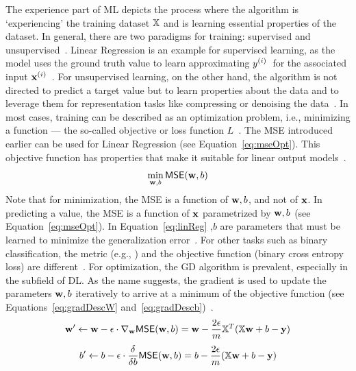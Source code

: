 The experience part of \ac{ML} depicts the process where the algorithm is `experiencing' the training
dataset $\mathbb{X}$ and is learning essential properties of the dataset.
In general, there are two paradigms for training: supervised and
unsupervised~\citep{goodfellow_deep_2016}.
Linear Regression is an example for supervised learning, as the model uses the ground truth value
to learn approximating $y^{(i)}$\ for the associated input
$\textbf{x}^{(i)}$~\citep{alzubi_machine_2018,goodfellow_deep_2016}.
For unsupervised learning, on the other hand, the algorithm is not directed to predict a target
value but to learn properties about the data and to leverage them for representation tasks
like compressing or denoising the data~\citep{goodfellow_deep_2016,geron_hands-machine_2017}.
In most cases, training can be described as an optimization problem, i.e., minimizing a
function --- the so-called objective or loss function $L$~\citep{goodfellow_deep_2016}.
The \ac{MSE} introduced earlier can be used for Linear Regression (see Equation~\ref{eq:mseOpt}).
This objective function has properties that make it suitable for linear output
models~\citep{goodfellow_deep_2016}.
\begin{equation}\label{eq:mseOpt}
    \min_{\textbf{w},b} \textsf{MSE}(\textbf{w},b)
\end{equation}
Note that for minimization, the \ac{MSE} is a function of $\textbf{w},b$, and not of $\textbf{x}$.
In predicting a value, the \ac{MSE} is a function of $\textbf{x}$ parametrized by $\textbf{w},b$ (see
Equation~\ref{eq:mseOpt}).
In Equation~\ref{eq:linReg} \w,$b$ are parameters that must be learned to minimize
the generalization error~\citep{james_introduction_2013,geron_hands-machine_2017}.
For other tasks such as binary classification, the metric (e.g., \fone) and the
objective function (binary cross entropy loss) are different~\citep{geron_hands-machine_2017,
ho_real-world-weight_2020}.
For optimization, the \ac{GD} algorithm is prevalent, especially in the subfield of \ac{DL}.
As the name suggests, the gradient is used to update the parameters $\textbf{w},b$ iteratively  to arrive
at a minimum of the objective function (see Equations~\ref{eq:gradDescW}
and~\ref{eq:gradDescb})~\citep{geron_hands-machine_2017}.
\begin{equation}\label{eq:gradDescW}
    \textbf{w}'\leftarrow \textbf{w}-\epsilon\cdot\nabla_{\textbf{w}} \textsf{MSE}(\textbf{w},b)
        = \textbf{w}-\frac{2\epsilon}{m}\mathbb{X}^T (\mathbb{X}\textbf{w}+b-\textbf{y})
\end{equation}
\begin{equation}\label{eq:gradDescb}
    b'\leftarrow b-\epsilon\cdot\frac{\delta}{\delta b} \textsf{MSE}(\textbf{w},b)
        = b-\frac{2\epsilon}{m}(\mathbb{X}\textbf{w}+b-\textbf{y})
\end{equation}

